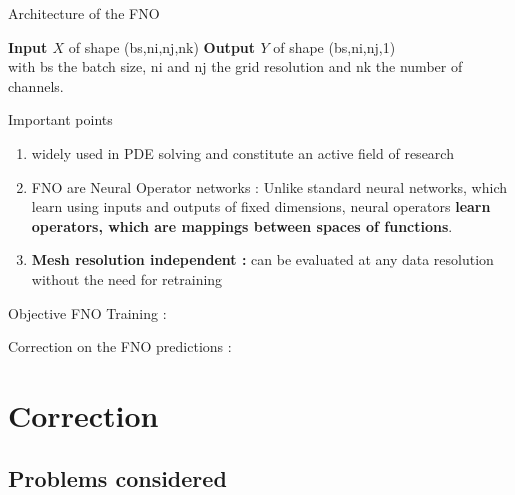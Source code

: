 \documentclass[compress,10pt,xcolor={table,dvipsnames},t]{beamer}
\begin{document}
	\begin{frame}{Architecture of the FNO}
		\begin{center}
			\centering
		\end{center}
		\textbf{Input $X$} of shape (bs,ni,nj,nk) \qquad \qquad \textbf{Output $Y$} of shape (bs,ni,nj,1) \\
		with bs the batch size, ni and nj the grid resolution and nk the number of channels.
	\end{frame}

	\begin{frame}{Important points}
		\begin{enumerate}[\ding{217}]
			\item widely used in PDE solving and constitute an active field of research
			\item FNO are Neural Operator networks : Unlike standard neural networks, which learn using inputs and outputs of fixed dimensions, neural operators \textbf{learn operators, which are mappings between spaces of functions}.
			\item \textbf{Mesh resolution independent :} can be evaluated at any data resolution without the need for retraining
		\end{enumerate}
	\end{frame}

	\begin{frame}{Objective}
		FNO Training :
		\begin{center}
		\end{center}
		Correction on the FNO predictions :
		\begin{center}
		\end{center}
	\end{frame}
	
	\section{Correction}
	
	\subsection{Problems considered}
	
\end{document}
